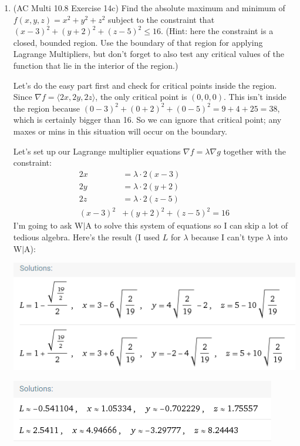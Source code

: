 \documentclass[10pt]{article}
\newcommand\del\nabla
\newenvironment{red}{\color{red}}{\ignorespacesafterend}
\begin{document}
\begin{enumerate}[leftmargin=0pt]
\item (AC Multi 10.8 Exercise 14c) Find the absolute maximum and minimum of $f(x,y,z) = x^2+y^2+z^2$ subject to the constraint that $(x-3)^2 + (y+2)^2 + (z-5)^2 \le 16\text{.}$ (Hint: here the constraint is a closed, bounded region. Use the boundary of that region for applying Lagrange Multipliers, but don't forget to also test any critical values of the function that lie in the interior of the region.)

\begin{red}
Let's do the easy part first and check for critical points inside the region. Since $\del f = \langle 2x, 2y, 2z \rangle$, the only critical point is $(0, 0, 0)$. This isn't inside the region because $(0-3)^2 + (0+2)^2 + (0-5)^2 = 9 + 4 + 25 = 38$, which is certainly bigger than 16. So we can ignore that critical point; any maxes or mins in this situation will occur on the boundary.

Let's set up our Lagrange multiplier equations $\del f = \lambda \del g$ together with the constraint:
\begin{align*}
    2x &= \lambda\cdot 2(x-3) \\
    2y &= \lambda \cdot 2(y+2) \\
    2z &= \lambda \cdot 2(z-5) \\
    (x-3)^2 &+ (y+2)^2 + (z-5)^2 = 16
\end{align*}
I'm going to ask W$|$A to solve this system of equations so I can skip a lot of tedious algebra. Here's the result (I used $L$ for $\lambda$ because I can't type $\lambda$ into W$|$A):

\includegraphics[]{203-keys/ps9-answer-key/wa-exact.png}

\includegraphics[]{203-keys/ps9-answer-key/wa-approx.png}


\end{red}
\end{enumerate}
\end{document}
